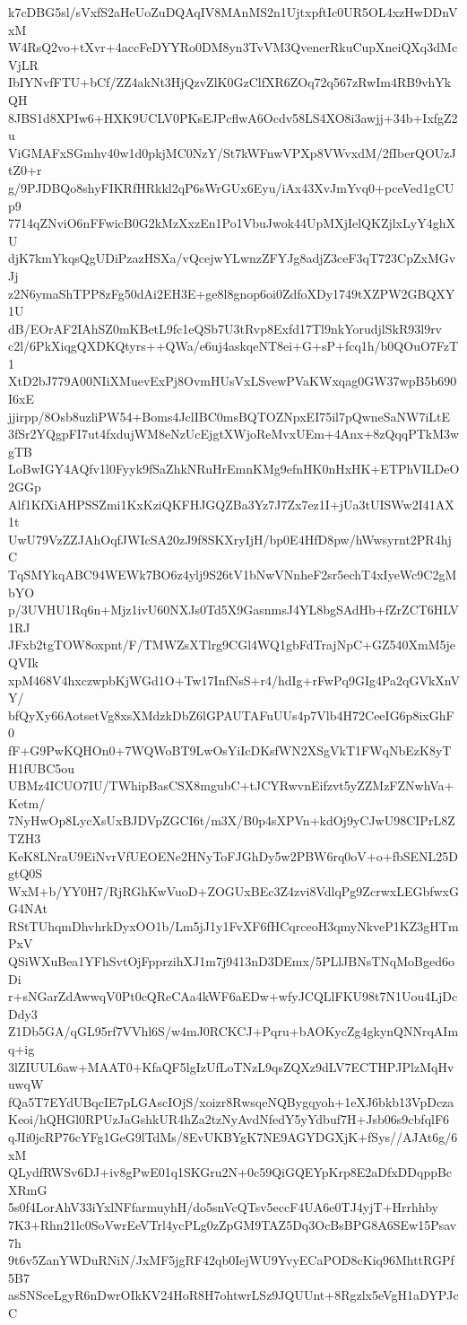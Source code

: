 k7cDBG5sl/sVxfS2aHeUoZuDQAqIV8MAnMS2n1UjtxpftIc0UR5OL4xzHwDDnVxM
W4RsQ2vo+tXvr+4accFeDYYRo0DM8yn3TvVM3QvenerRkuCupXneiQXq3dMcVjLR
IbIYNvfFTU+bCf/ZZ4akNt3HjQzvZlK0GzClfXR6ZOq72q567zRwIm4RB9vhYkQH
8JBS1d8XPIw6+HXK9UCLV0PKsEJPcflwA6Ocdv58LS4XO8i3awjj+34b+IxfgZ2u
ViGMAFxSGmhv40w1d0pkjMC0NzY/St7kWFnwVPXp8VWvxdM/2fIberQOUzJtZ0+r
g/9PJDBQo8shyFIKRfHRkkl2qP6sWrGUx6Eyu/iAx43XvJmYvq0+pceVed1gCUp9
7714qZNviO6nFFwicB0G2kMzXxzEn1Po1VbuJwok44UpMXjIelQKZjlxLyY4ghXU
djK7kmYkqsQgUDiPzazHSXa/vQcejwYLwnzZFYJg8adjZ3ceF3qT723CpZxMGvJj
z2N6ymaShTPP8zFg50dAi2EH3E+ge8l8gnop6oi0ZdfoXDy1749tXZPW2GBQXY1U
dB/EOrAF2IAhSZ0mKBetL9fc1eQSb7U3tRvp8Exfd17Tl9nkYorudjlSkR93l9rv
c2l/6PkXiqgQXDKQtyrs++QWa/e6uj4askqeNT8ei+G+sP+fcq1h/b0QOuO7FzT1
XtD2bJ779A00NIiXMuevExPj8OvmHUsVxLSvewPVaKWxqag0GW37wpB5b690I6xE
jjirpp/8Osb8uzliPW54+Boms4JclIBC0msBQTOZNpxEI75il7pQwneSaNW7iLtE
3fSr2YQgpFI7ut4fxdujWM8eNzUcEjgtXWjoReMvxUEm+4Anx+8zQqqPTkM3wgTB
LoBwIGY4AQfv1l0Fyyk9fSaZhkNRuHrEmnKMg9efnHK0nHxHK+ETPhVILDeO2GGp
Alf1KfXiAHPSSZmi1KxKziQKFHJGQZBa3Yz7J7Zx7ez1I+jUa3tUISWw2I41AX1t
UwU79VzZZJAhOqfJWIcSA20zJ9f8SKXryIjH/bp0E4HfD8pw/hWwsyrnt2PR4hjC
TqSMYkqABC94WEWk7BO6z4ylj9S26tV1bNwVNnheF2sr5echT4xIyeWc9C2gMbYO
p/3UVHU1Rq6n+Mjz1ivU60NXJs0Td5X9GasnmsJ4YL8bgSAdHb+fZrZCT6HLV1RJ
JFxb2tgTOW8oxpnt/F/TMWZsXTlrg9CGl4WQ1gbFdTrajNpC+GZ540XmM5jeQVIk
xpM468V4hxczwpbKjWGd1O+Tw17InfNsS+r4/hdIg+rFwPq9GIg4Pa2qGVkXnVY/
bfQyXy66AotsetVg8xsXMdzkDbZ6lGPAUTAFuUUs4p7Vlb4H72CeeIG6p8ixGhF0
fF+G9PwKQHOn0+7WQWoBT9LwOsYiIcDKsfWN2XSgVkT1FWqNbEzK8yTH1fUBC5ou
UBMz4ICUO7IU/TWhipBasCSX8mgubC+tJCYRwvnEifzvt5yZZMzFZNwhVa+Ketm/
7NyHwOp8LycXsUxBJDVpZGCI6t/m3X/B0p4sXPVn+kdOj9yCJwU98CIPrL8ZTZH3
KeK8LNraU9EiNvrVfUEOENe2HNyToFJGhDy5w2PBW6rq0oV+o+fbSENL25DgtQ0S
WxM+b/YY0H7/RjRGhKwVuoD+ZOGUxBEc3Z4zvi8VdlqPg9ZcrwxLEGbfwxGG4NAt
RStTUhqmDhvhrkDyxOO1b/Lm5jJ1y1FvXF6fHCqrceoH3qmyNkveP1KZ3gHTmPxV
QSiWXuBea1YFhSvtOjFpprzihXJ1m7j9413nD3DEmx/5PLlJBNsTNqMoBged6oDi
r+sNGarZdAwwqV0Pt0cQReCAa4kWF6aEDw+wfyJCQLlFKU98t7N1Uou4LjDcDdy3
Z1Db5GA/qGL95rf7VVhl6S/w4mJ0RCKCJ+Pqru+bAOKycZg4gkynQNNrqAImq+ig
3lZIUUL6aw+MAAT0+KfaQF5lgIzUfLoTNzL9qsZQXz9dLV7ECTHPJPlzMqHvuwqW
fQa5T7EYdUBqcIE7pLGAscIOjS/xoizr8RwsqeNQBygqyoh+1eXJ6bkb13VpDcza
Keoi/hQHGl0RPUzJaGshkUR4hZa2tzNyAvdNfedY5yYdbuf7H+Jsb06s9cbfqlF6
qJIi0jcRP76cYFg1GeG9lTdMs/8EvUKBYgK7NE9AGYDGXjK+fSys//AJAt6g/6xM
QLydfRWSv6DJ+iv8gPwE01q1SKGru2N+0c59QiGQEYpKrp8E2aDfxDDqppBcXRmG
5s0f4LorAhV33iYxlNFfarmuyhH/do5snVcQTsv5eccF4UA6e0TJ4yjT+Hrrhhby
7K3+Rhn21lc0SoVwrEeVTrl4ycPLg0zZpGM9TAZ5Dq3OcBsBPG8A6SEw15Psav7h
9t6v5ZanYWDuRNiN/JxMF5jgRF42qb0IejWU9YvyECaPOD8cKiq96MhttRGPf5B7
asSNSceLgyR6nDwrOIkKV24HoR8H7ohtwrLSz9JQUUnt+8Rgzlx5eVgH1aDYPJcC
